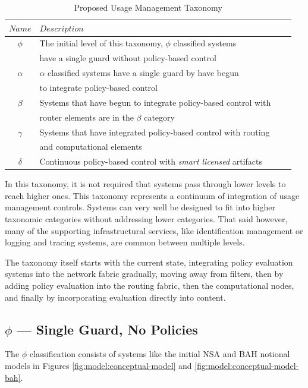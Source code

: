 \documentclass[12pt,letterpaper]{article}
\begin{document}
\begin{table}[tp] %
\centering %
\begin{tabular}{clcc}
\toprule %
$ Name$ 	& $Description$ \\\toprule %
$\phi$ 		& The initial level of this taxonomy, $\phi$ classified systems \\
 			& have a single guard without policy-based control \\\midrule
$\alpha$	& $\alpha$ classified systems have a single guard by have begun \\
			& to integrate policy-based control \\\midrule
$\beta$		& Systems that have begun to integrate policy-based control with \\
			& router elements are in the $\beta$ category \\\midrule
$\gamma$	& Systems that have integrated policy-based control with routing \\
			& and computational elements \\\midrule
$\delta$	& Continuous policy-based control with \textit{smart licensed} artifacts \\\bottomrule
\end{tabular}
\caption{Proposed Usage Management Taxonomy}
\label{table:model:taxonomy}
\end{table}

In this taxonomy, it is not required that systems pass through lower levels to reach higher ones.  This taxonomy represents a continuum of integration of usage management controls.  Systems can very well be designed to fit into higher taxonomic categories without addressing lower categories.  That said however, many of the supporting infrastructural services, like identification management or logging and tracing systems, are common between multiple levels.

The taxonomy itself starts with the current state, integrating policy evaluation systems into the network fabric gradually, moving away from filters, then by adding policy evaluation into the routing fabric, then the computational nodes, and finally by incorporating evaluation directly into content.

\subsection{$\phi$ --- Single Guard, No Policies}
The $\phi$ classification consists of systems like the initial NSA and BAH notional models in Figures \ref{fig:model:conceptual-model} and \ref{fig:model:conceptual-model-bah}.
\end{document}
